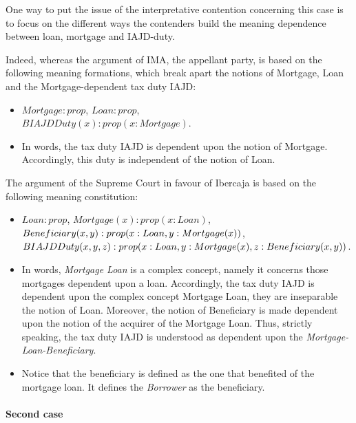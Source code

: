 			One way to put the issue of the interpretative contention concerning this case is to focus on the different ways the contenders build the meaning dependence between loan, mortgage and IAJD-duty.
			
			Indeed, whereas the argument of IMA, the appellant party, is based on the following meaning formations, which break apart the notions of Mortgage, Loan and the Mortgage-dependent tax duty IAJD:
				\begin{itemize}
					\item $Mortgage : prop$, $Loan: prop$, \\ 
					$BIAJDDuty(x): prop (x: Mortgage)$.
					\item In words, the tax duty IAJD is dependent upon the notion of Mortgage. Accordingly, this duty is independent of the notion of Loan.
				\end{itemize}
						
			The argument of the Supreme Court in favour of Ibercaja is based on the following meaning constitution:
				\begin{itemize}
					\item $Loan: prop$, $Mortgage(x): prop (x: Loan)$, \\ 
						$Beneficiary\index{beneficiary}(x,y): prop (x: Loan, y: Mortgage(x))$, \\
						$BIAJDDuty(x,y,z): prop (x: Loan, \\ y: Mortgage(x), z: Beneficiary\index{beneficiary}(x,y))$. 
					\item In words, \textit{Mortgage Loan} is a complex concept, namely it concerns those mortgages dependent upon a loan. Accordingly, the tax duty IAJD is dependent upon the complex concept Mortgage Loan, they are inseparable the notion of Loan. Moreover, the notion of Beneficiary is made dependent upon the notion of the acquirer of the Mortgage Loan. Thus, strictly speaking, the tax duty IAJD is understood as dependent upon the \textit{Mortgage-Loan-Beneficiary}.
					\item Notice that the beneficiary is defined as the one that benefited of the mortgage loan. It defines the \textit{Borrower} as the beneficiary.
				\end{itemize}

			\paragraph{Second case}

